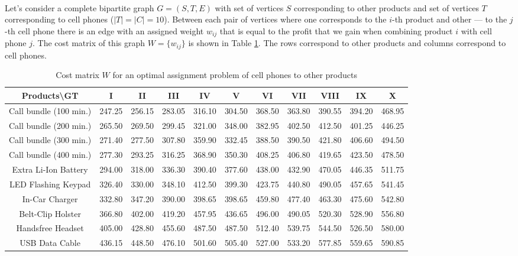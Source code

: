 \begin{enumerate}[(a)]
	\paragraph{}
	Let's consider a complete bipartite graph $G=(S,T,E)$ with set of vertices $S$ corresponding to other products and set of vertices $T$ corresponding to cell phones ($|T|=|C|=10$). Between each pair of vertices where one corresponds to the $i$-th product and other --- to the $j$-th cell phone there is an edge with an assigned weight $w_{ij}$ that is equal to the profit that we gain when combining product $i$ with cell phone $j$. The cost matrix of this graph $W=\{w_{ij}\}$ is shown in Table \ref{graph-5-c}. The rows correspond to other products and columns correspond to cell phones.

\begin{table}[H]
	\centering
	\caption{Cost matrix $W$ for an optimal assignment problem of cell phones to other products}
	\begin{tabular}{|*{11}{c|}}\hline
Products\textbackslash GT & I & II & III & IV & V & VI & VII & VIII & IX & X\\\hline
Call bundle (100 min.) & 247.25  & 256.15  & 283.05  & 316.10  & 304.50  & 368.50  & 363.80  & 390.55  & 394.20  & 468.95 \\ \hline
Call bundle (200 min.) & 265.50  & 269.50  & 299.45  & 321.00  & 348.00  & 382.95  & 402.50  & 412.50  & 401.25  & 446.25 \\ \hline
Call bundle (300 min.) & 271.40  & 277.50  & 307.80  & 359.90  & 332.45  & 388.50  & 390.50  & 421.80  & 406.60  & 494.50 \\ \hline
Call bundle (400 min.) & 277.30  & 293.25  & 316.25  & 368.90  & 350.30  & 408.25  & 406.80  & 419.65  & 423.50  & 478.50 \\ \hline
Extra Li-Ion Battery & 294.00  & 318.00  & 336.30  & 390.40  & 377.60  & 438.00  & 432.90  & 470.05  & 446.35  & 511.75 \\ \hline
LED Flashing Keypad & 326.40  & 330.00  & 348.10  & 412.50  & 399.30  & 423.75  & 440.80  & 490.05  & 457.65  & 541.45 \\ \hline
In-Car Charger & 332.80  & 347.20  & 390.00  & 398.65  & 398.65  & 459.80  & 477.40  & 463.30  & 475.60  & 542.80 \\ \hline
Belt-Clip Holster & 366.80  & 402.00  & 419.20  & 457.95  & 436.65  & 496.00  & 490.05  & 520.30  & 528.90  & 556.80 \\ \hline
Handsfree Headset & 405.00  & 428.80  & 455.60  & 487.50  & 487.50  & 512.40  & 539.75  & 544.50  & 526.50  & 580.00 \\ \hline
USB Data Cable & 436.15  & 448.50  & 476.10  & 501.60  & 505.40  & 527.00  & 533.20  & 577.85  & 559.65  & 590.85 \\ \hline
	\end{tabular}
	\label{graph-5-c}
\end{table}
	

\end{enumerate}
